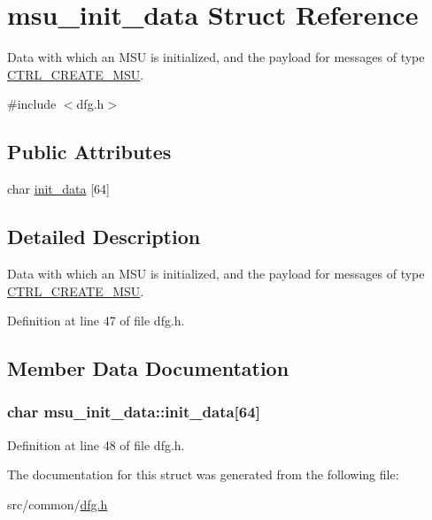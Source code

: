 \hypertarget{structmsu__init__data}{\section{msu\-\_\-init\-\_\-data Struct Reference}
\label{structmsu__init__data}
}


Data with which an M\-S\-U is initialized, and the payload for messages of type \hyperlink{ctrl__runtime__messages_8h_aff250b7918a6975b13277c84bc6ec5b9a63b47c3674f449f7bb6842ff88c04d5e}{C\-T\-R\-L\-\_\-\-C\-R\-E\-A\-T\-E\-\_\-\-M\-S\-U}.  




{\ttfamily \#include $<$dfg.\-h$>$}

\subsection*{Public Attributes}
\begin{DoxyCompactItemize}
\item 
char \hyperlink{structmsu__init__data_a9855c57d43bdbbb52bd766ae8dfd42f3}{init\-\_\-data} \mbox{[}64\mbox{]}
\end{DoxyCompactItemize}


\subsection{Detailed Description}
Data with which an M\-S\-U is initialized, and the payload for messages of type \hyperlink{ctrl__runtime__messages_8h_aff250b7918a6975b13277c84bc6ec5b9a63b47c3674f449f7bb6842ff88c04d5e}{C\-T\-R\-L\-\_\-\-C\-R\-E\-A\-T\-E\-\_\-\-M\-S\-U}. 

Definition at line 47 of file dfg.\-h.



\subsection{Member Data Documentation}
\hypertarget{structmsu__init__data_a9855c57d43bdbbb52bd766ae8dfd42f3}{
\subsubsection[{init\-\_\-data}]{\setlength{\rightskip}{0pt plus 5cm}char msu\-\_\-init\-\_\-data\-::init\-\_\-data\mbox{[}64\mbox{]}}}\label{structmsu__init__data_a9855c57d43bdbbb52bd766ae8dfd42f3}


Definition at line 48 of file dfg.\-h.



The documentation for this struct was generated from the following file\-:\begin{DoxyCompactItemize}
\item 
src/common/\hyperlink{dfg_8h}{dfg.\-h}\end{DoxyCompactItemize}
